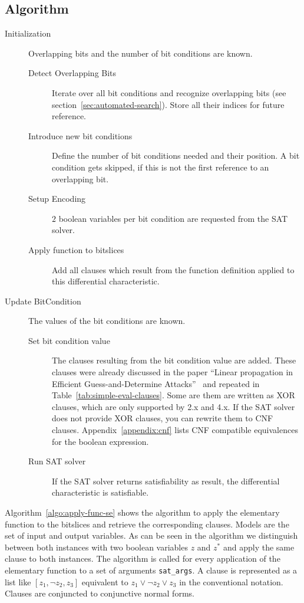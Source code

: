 \subsection{Algorithm}
\label{sec:simple-evaluation-algorithm}
%
\begin{description}
  \item[Initialization] Overlapping bits and the number of bit conditions are known.
    \begin{description}
      \item[Detect Overlapping Bits] Iterate over all bit conditions and recognize overlapping bits (see section~\ref{sec:automated-search}). Store all their indices for future reference.
      \item[Introduce new bit conditions] Define the number of bit conditions needed and their position. A bit condition gets skipped, if this is not the first reference to an overlapping bit.
      \item[Setup Encoding] $2$ boolean variables per bit condition are requested from the SAT solver.
      \item[Apply function to bitslices] Add all clauses which result from the function definition applied to this differential characteristic.
    \end{description}
  \item[Update BitCondition] The values of the bit conditions are known.
    \begin{description}
      \item[Set bit condition value] The clauses resulting from the bit condition value are added. These clauses were already discussed in the paper ``Linear propagation in Efficient Guess-and-Determine Attacks''~\cite[6]{Cry16} and repeated in Table~\ref{tab:simple-eval-clauses}. Some are them are written as XOR clauses, which are only supported by \cmsat{} 2.x and 4.x. If the SAT solver does not provide XOR clauses, you can rewrite them to CNF clauses. Appendix~\ref{appendix:cnf} lists CNF compatible equivalences for the boolean expression.
      \item[Run SAT solver] If the SAT solver returns satisfiability as result, the differential characteristic is satisfiable.
    \end{description}
\end{description}

Algorithm~\ref{algo:apply-func-se} shows the algorithm to apply the elementary function to the bitslices and retrieve the corresponding clauses. Models are the set of input and output variables. As can be seen in the algorithm we distinguish between both instances with two boolean variables $z$ and $z^*$ and apply the same clause to both instances. The algorithm is called for every application of the elementary function to a set of arguments \texttt{sat\_args}. A clause is represented as a list like $[z_1, \neg z_2, z_3]$ equivalent to $z_1 \lor \neg z_2 \lor z_3$ in the conventional notation. Clauses are conjuncted to conjunctive normal forms.

